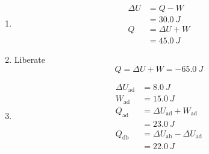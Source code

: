 \documentclass{article}
\begin{document}
\begin{enumerate}
  \item

        \begin{align*}
          \Delta U & = Q - W         \\
                   & = \qty{30.0}{J} \\
          Q        & = \Delta U + W  \\
                   & = \qty{45.0}{J}
        \end{align*}

  \item Liberate \[Q = \Delta U + W = \qty{-65.0}{J}\]

  \item

        \begin{align*}
          \Delta U_\text{ad} & = \qty{8.0}{J}                            \\
          W_\text{ad}        & = \qty{15.0}{J}                           \\
          Q_\text{ad}        & = \Delta U_\text{ad} + W_\text{ad}        \\
                             & = \qty{23.0}{J}                           \\
          Q_\text{db}        & = \Delta U_\text{ab} - \Delta U_\text{ad} \\
                             & = \qty{22.0}{J}
        \end{align*}
\end{enumerate}

\setcounter{subsubsection}{42}
\subsubsection{}
\end{document}
